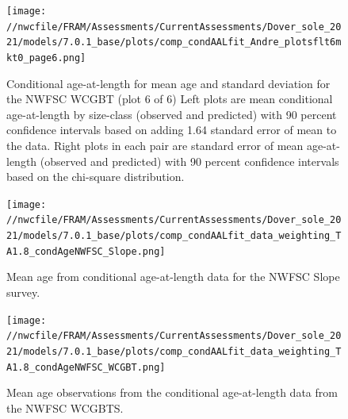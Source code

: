 \documentclass[11pt,
  english,
  a4paper,
]{article}
\begin{document}
\tagmcend\tagstructend


\begin{figure}
\centering
\texttt{[image: //nwcfile/FRAM/Assessments/CurrentAssessments/Dover\_sole\_2021/models/7.0.1\_base/plots/comp\_condAALfit\_Andre\_plotsflt6mkt0\_page6.png]}
\caption{Conditional age-at-length for mean age and standard deviation for the NWFSC WCGBT (plot 6 of 6) Left plots are mean conditional age-at-length by size-class (observed and predicted) with 90 percent confidence intervals based on adding 1.64 standard error of mean to the data. Right plots in each pair are standard error of mean age-at-length (observed and predicted) with 90 percent confidence intervals based on the chi-square distribution.\label{fig:wcgbt-caal-fit-6}}
\end{figure}

\tagmcend\tagstructend


\begin{figure}
\centering
\texttt{[image: //nwcfile/FRAM/Assessments/CurrentAssessments/Dover\_sole\_2021/models/7.0.1\_base/plots/comp\_condAALfit\_data\_weighting\_TA1.8\_condAgeNWFSC\_Slope.png]}
\caption{Mean age from conditional age-at-length data for the NWFSC Slope survey.\label{fig:nwslope-mean-caal}}
\end{figure}

\tagmcend\tagstructend


\begin{figure}
\centering
\texttt{[image: //nwcfile/FRAM/Assessments/CurrentAssessments/Dover\_sole\_2021/models/7.0.1\_base/plots/comp\_condAALfit\_data\_weighting\_TA1.8\_condAgeNWFSC\_WCGBT.png]}
\caption{Mean age observations from the conditional age-at-length data from the NWFSC WCGBTS.\label{fig:wcgbt-mean-age}}
\end{figure}
\end{document}
